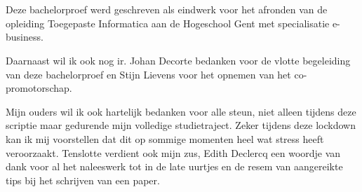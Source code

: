 
\chapter*{}
\label{ch:voorwoord}



Deze bachelorproef werd geschreven als eindwerk voor het afronden van de opleiding Toegepaste Informatica aan de Hogeschool Gent met specialisatie e-business.


Daarnaast wil ik ook nog ir. Johan Decorte bedanken voor de vlotte begeleiding van deze bachelorproef en Stijn Lievens voor het opnemen van het co-promotorschap.

Mijn ouders wil ik ook hartelijk bedanken voor alle steun, niet alleen tijdens deze scriptie maar gedurende mijn volledige studietraject. Zeker tijdens deze lockdown kan ik mij voorstellen dat dit op sommige momenten heel wat stress heeft veroorzaakt.
Tenslotte verdient ook mijn zus, Edith Declercq een woordje van dank voor al het naleeswerk tot in de late uurtjes en de resem van aangereikte tips bij het schrijven van een paper.

 




